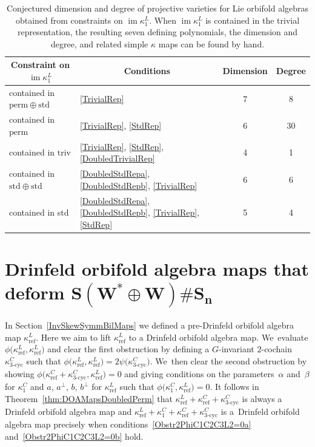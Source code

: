 \documentclass[10pt,a4paper]{amsart}
\numberwithin{equation}{section}
\DeclareMathOperator{\im}{im}
\DeclareMathOperator{\refl}{ref}
\DeclareMathOperator{\tri}{3-cyc}
\begin{document}
\begin{table}[hbt]
\begin{center}
\caption{Conjectured dimension and degree of projective varieties %
for Lie orbifold algebras obtained from constraints on $\im \kappa^L_1$. When $\im \kappa^L_1$ is contained in the trivial representation, the resulting seven defining polynomials, the dimension and degree, and related simple $\kappa$ maps can be found by hand.}\label{table:subvars}

\vspace{2mm}

\renewcommand{\arraystretch}{1.2}%
\begin{tabular}{l|l|c|c}
\hline
\multicolumn{1}{c|}{Constraint on $\im \kappa^L_1$} & \multicolumn{1}{c|}{Conditions} & \multicolumn{1}{c|}{Dimension} & \multicolumn{1}{c}{Degree}\\
\hline
contained in $\mathrm{perm} \oplus \mathrm{std}$ & \eqref{TrivialRep} & 7 & 8 \\
contained in $\mathrm{perm}$ & \eqref{TrivialRep}, \eqref{StdRep} & 6 & 30 \\
contained in $\mathrm{triv}$ & \eqref{TrivialRep}, \eqref{StdRep}, \eqref{DoubledTrivialRep} & 4 & 1 \\
contained in $\mathrm{std} \oplus \mathrm{std}$ & \eqref{DoubledStdRepa}, \eqref{DoubledStdRepb}, \eqref{TrivialRep} & 6 & 6 \\
contained in std & \eqref{DoubledStdRepa}, \eqref{DoubledStdRepb}, \eqref{TrivialRep}, \eqref{StdRep} & 5 & 4
\\
\hline
\end{tabular}
\end{center}
\end{table}

\section[Drinfeld orbifold algebra maps that deform S(W* + W) Sn]
{Drinfeld orbifold algebra maps that deform $\boldsymbol{S(W^* \oplus W)\# S_n}$}\label{Lifting}

In Section~\ref{InvSkewSymmBilMaps} we defined a pre-Drinfeld orbifold algebra map
$\kappa^L_{\refl}$. Here we aim to lift $\kappa^L_{\refl}$ to a Drinfeld orbifold
algebra map. We~evaluate $\phi\big(\kappa^L_{\refl},\kappa^L_{\refl}\big)$
and clear the first obstruction by defining a $G$-invariant $2$-cochain
$\kappa^C_{\tri}$ such that $\phi\big(\kappa^L_{\refl},\kappa^L_{\refl}\big)=2\psi\big(\kappa^C_{\tri}\big)$. We~then clear the second obstruction by showing
$\phi\big(\kappa^C_{\refl}+\kappa^C_{\tri},\kappa^L_{\refl}\big)=0$ and giving conditions on
the parameters~$\alpha$ and~$\beta$ for $\kappa^C_1$ and $a$, $a^\perp$, $b$, $b^\perp$
for $\kappa^L_{\refl}$ such that $\phi\big(\kappa^C_1,\kappa^L_{\refl}\big)=0$. It follows
in Theorem~\ref{thm:DOAMapsDoubledPerm} that
$\kappa^L_{\refl}+\kappa^C_{\refl}+\kappa^C_{\tri}$ is always a Drinfeld orbifold
algebra map and $\kappa^L_{\refl}+\kappa^C_1+\kappa^C_{\refl}+\kappa^C_{\tri}$ is
a~Drinfeld orbifold algebra map precisely when conditions~\eqref{Obstr2PhiC1C2C3L2=0a}
and~\eqref{Obstr2PhiC1C2C3L2=0b} hold.
\end{document}
